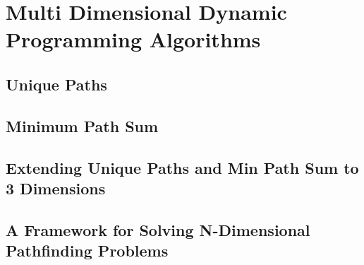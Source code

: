\chapter{Multi Dimensional Dynamic Programming Algorithms}

\section{Unique Paths}


\section{Minimum Path Sum}


\section{Extending Unique Paths and Min Path Sum to 3 Dimensions}


\section{A Framework for Solving N-Dimensional Pathfinding Problems}
